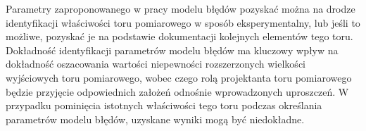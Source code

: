 Parametry zaproponowanego w pracy modelu błędów pozyskać można na drodze identyfikacji właściwości toru pomiarowego w sposób eksperymentalny, lub jeśli to możliwe, pozyskać je na podstawie dokumentacji kolejnych elementów tego toru. Dokładność identyfikacji parametrów modelu błędów ma kluczowy wpływ na dokładność oszacowania wartości niepewności rozszerzonych wielkości wyjściowych toru pomiarowego, wobec czego rolą projektanta toru pomiarowego będzie przyjęcie odpowiednich założeń odnośnie wprowadzonych uproszczeń. W przypadku pominięcia istotnych właściwości tego toru podczas określania parametrów modelu błędów, uzyskane wyniki mogą być niedokładne.
